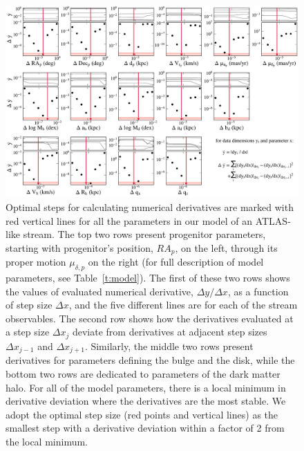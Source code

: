 \documentclass[modern]{aastex61}
\begin{document}
\begin{figure}
\begin{center}
\includegraphics[width=\textwidth]{derivative_steps.pdf}
\caption{Optimal steps for calculating numerical derivatives are marked with red vertical lines for all the parameters in our model of an ATLAS-like stream.
The top two rows present progenitor parameters, starting with progenitor's position, $RA_p$, on the left, through its proper motion $\mu_{\delta,p}$ on the right (for full description of model parameters, see Table~\ref{t:model}).
The first of these two rows shows the values of evaluated numerical derivative, $\Delta y/\Delta x$, as a function of step size $\Delta x$, and the five different lines are for each of the stream observables. 
The second row shows how the derivatives evaluated at a step size $\Delta x_j$ deviate from derivatives at adjacent step sizes $\Delta x_{j-1}$ and $\Delta x_{j+1}$.
Similarly, the middle two rows present derivatives for parameters defining the bulge and the disk, while the bottom two rows are dedicated to parameters of the dark matter halo.
For all of the model parameters, there is a local minimum in derivative deviation where the derivatives are the most stable.
We adopt the optimal step size (red points and vertical lines) as the smallest step with a derivative deviation within a factor of 2 from the local minimum.
}
\label{fig:derivative_conv}
\end{center}
\end{figure}
\end{document}
